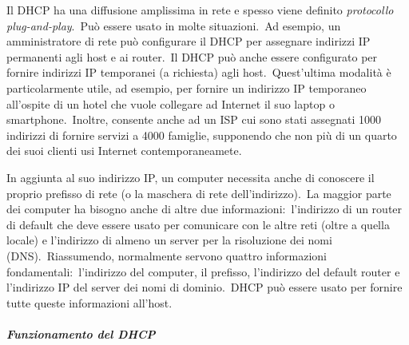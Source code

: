 Il DHCP ha una diffusione amplissima in rete e spesso viene definito \emph{protocollo plug-and-play}.\
Può essere usato in molte situazioni.\
Ad esempio, un amministratore di rete può configurare il DHCP per assegnare indirizzi IP permanenti agli host e ai router.\
Il DHCP può anche essere configurato per fornire indirizzi IP temporanei (a richiesta) agli host.\
Quest'ultima modalità è particolarmente utile, ad esempio, per fornire un indirizzo IP temporaneo all'ospite di un hotel che vuole collegare ad Internet il suo laptop o smartphone.\
Inoltre, consente anche ad un ISP cui sono stati assegnati 1000 indirizzi di fornire servizi a 4000 famiglie, supponendo che non più di un quarto dei suoi clienti usi Internet contemporaneamete.

In aggiunta al suo indirizzo IP, un computer necessita anche di conoscere il proprio prefisso di rete (o la maschera di rete dell'indirizzo).\
La maggior parte dei computer ha bisogno anche di altre due informazioni:\ l'indirizzo di un router di default che deve essere usato per comunicare con le altre reti (oltre a quella locale) e l'indirizzo di almeno un server per la risoluzione dei nomi (DNS).\
Riassumendo, normalmente servono quattro informazioni fondamentali:\ l'indirizzo del computer, il prefisso, l'indirizzo del default router e l'indirizzo IP del server dei nomi di dominio.\
DHCP può essere usato per fornire tutte queste informazioni all'host.

\paragraph{\emph{Funzionamento del DHCP}}

